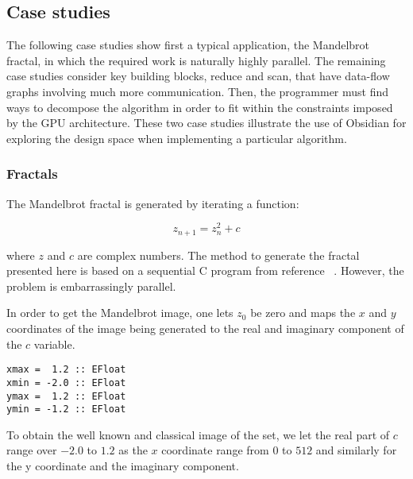 \subsection{Case studies} 
\label{sec:CASESTUDIES}


The following case studies show first a typical application, the Mandelbrot 
fractal, in which the required work is naturally highly parallel.
The remaining case studies consider key building blocks, reduce and scan, 
that have data-flow graphs involving much more communication. Then, the 
programmer must find ways to decompose the algorithm in order to fit within
the constraints imposed by the GPU architecture. These two case studies illustrate 
the use of Obsidian for exploring the design space when implementing a particular algorithm.

\subsubsection{Fractals} 

The Mandelbrot fractal is generated by iterating a function: 

\begin{equation*} 
 z_{n+1} = z_n^2 + c
\end{equation*} 

\noindent where $z$ and $c$ are complex numbers. The method to generate the fractal 
presented here is based on a sequential C program from reference 
~. However, the problem is embarrassingly parallel.

In order to get the Mandelbrot image, one lets $z_0$ be zero and maps the 
$x$ and $y$ coordinates of the image being generated to the real and imaginary 
component of the $c$ variable.

\begin{small}
\begin{verbatim} 
xmax =  1.2 :: EFloat
xmin = -2.0 :: EFloat
ymax =  1.2 :: EFloat
ymin = -1.2 :: EFloat
\end{verbatim}
\end{small} 

To obtain the well known and classical image of the set, we let 
the real part of $c$ range over $-2.0$ to $1.2$ as the $x$ coordinate range from
$0$ to $512$ and similarly for the y coordinate and the imaginary component.  

